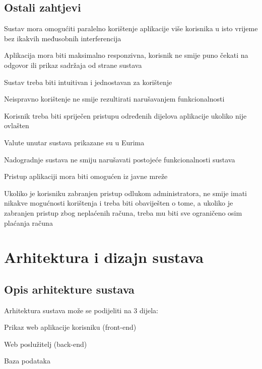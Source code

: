 \documentclass{article}
\begin{document}
		\subsection{Ostali zahtjevi}
		\begin{packed_enum}
			\item Sustav mora omogućiti paralelno korištenje aplikacije više korisnika u isto vrijeme bez ikakvih međusobnih interferencija
			\item Aplikacija mora biti maksimalno responzivna, korisnik ne smije puno čekati na odgovor ili prikaz sadržaja od strane sustava
			\item Sustav treba biti intuitivan i jednostavan za korištenje
			\item Neispravno korištenje ne smije rezultirati narušavanjem funkcionalnosti
			\item Korisnik treba biti spriječen pristupu određenih dijelova aplikacije ukoliko nije ovlašten
			\item Valute unutar sustava prikazane su u Eurima
			\item Nadogradnje sustava ne smiju narušavati postojeće funkcionalnosti sustava
			\item Pristup aplikaciji mora biti omogućen iz javne mreže
			\item Ukoliko je korisniku zabranjen pristup odlukom administratora, ne smije imati nikakve mogućnosti korištenja i treba biti obaviješten o tome, a ukoliko je zabranjen pristup zbog neplaćenih računa, treba mu biti sve ograničeno osim plaćanja računa
			\eject
		\end{packed_enum}
		
		\section{Arhitektura i dizajn sustava}
		\subsection{Opis arhitekture sustava}
		Arhitektura sustava može se podijeliti na 3 dijela:
		\begin{packed_enum}
			\item Prikaz web aplikacije korisniku (front-end)
			\item Web poslužitelj (back-end)
			\item Baza podataka
		\end{packed_enum}
	
\end{document}

